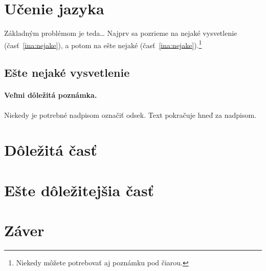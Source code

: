 \documentclass[10pt,twoside,slovak,a4paper]{article}
\begin{document}
\section{Učenie jazyka} \label{ucenie_jazyka}

Základným problémom je teda\ldots{} Najprv sa pozrieme na nejaké vysvetlenie (časť~\ref{ina:nejake}), a potom na ešte nejaké (časť~\ref{ina:nejake}).\footnote{Niekedy môžete potrebovať aj poznámku pod čiarou.}


\subsection{Ešte nejaké vysvetlenie} \label{ina:este}

\paragraph{Veľmi dôležitá poznámka.}
Niekedy je potrebné nadpisom označiť odsek. Text pokračuje hneď za nadpisom.



\section{Dôležitá časť} \label{dolezita}




\section{Ešte dôležitejšia časť} \label{dolezitejsia}




\section{Záver} \label{zaver} %






\end{document}
